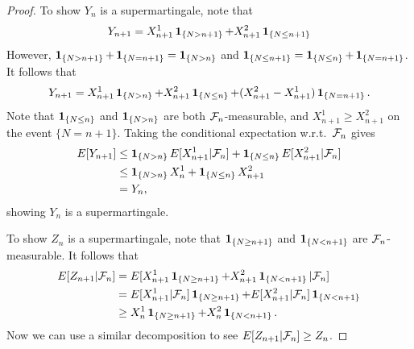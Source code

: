 \documentclass[a4paper]{article}
\begin{document}
\begin{proof}
  To show $Y_n$ is a supermartingale, note that
  \[
    Y_{n + 1} = X_{n + 1}^1 \operatorname{\mathbf{1}}_{\{N > n + 1\}} + X_{n + 1}^2 \operatorname{\mathbf{1}}_{\{N \leq n + 1\}}
  \]
  However, $\operatorname{\mathbf{1}}_{\{N > n + 1\}} + \operatorname{\mathbf{1}}_{\{N = n + 1\}} = \operatorname{\mathbf{1}}_{\{N > n\}}$
  and $\operatorname{\mathbf{1}}_{\{N \leq n + 1\}} = \operatorname{\mathbf{1}}_{\{N \leq n\}} + \operatorname{\mathbf{1}}_{\{N = n + 1\}}$.
  It follows that
  \[
    Y_{n + 1} = X_{n + 1}^1 \operatorname{\mathbf{1}}_{\{N > n\}}
    + X_{n + 1}^2 \operatorname{\mathbf{1}}_{\{N \leq n\}}
    + (X_{n+1}^2 - X_{n+1}^1) \operatorname{\mathbf{1}}_{\{N = n + 1\}}.
  \]
  Note that $\operatorname{\mathbf{1}}_{\{N \leq n\}}$ and
  $\operatorname{\mathbf{1}}_{\{N > n\}}$ are both $\mathcal{F}_n$-measurable, and
  $X_{n+1}^1 \geq X_{n+1}^2$ on the event $\{N = n + 1\}$.
  Taking the conditional expectation w.r.t.\ $\mathcal{F}_n$ gives
  \begin{align*}
    E[Y_{n + 1}]
     & \leq \operatorname{\mathbf{1}}_{\{N > n\}} E[X_{n+1}^1 | \mathcal{F}_n]
    + \operatorname{\mathbf{1}}_{\{N \leq n\}} E[X_{n+1}^2 | \mathcal{F}_n]                   \\
     & \leq \operatorname{\mathbf{1}}_{\{N > n\}} X_n^1 + \operatorname{\mathbf{1}}_{\{N \leq n\}} X_{n+1}^2 \\
     & = Y_n,
  \end{align*}
  showing $Y_n$ is a supermartingale.

  To show $Z_n$ is a supermartingale, note that $\operatorname{\mathbf{1}}_{\{N \geq n + 1\}}$
  and $\operatorname{\mathbf{1}}_{\{N < n + 1\}}$ are $\mathcal{F}_n$-measurable. It follows that
  \begin{align*}
    E[Z_{n + 1} | \mathcal{F}_n]
     & = E[X_{n + 1}^1 \operatorname{\mathbf{1}}_{\{N \geq n + 1\}} + X_{n + 1}^2 \operatorname{\mathbf{1}}_{\{N < n + 1\}} | \mathcal{F}_n]               \\
     & = E[X_{n + 1}^1 | \mathcal{F}_n] \operatorname{\mathbf{1}}_{\{N \geq n + 1\}} + E[X_{n + 1}^2  | \mathcal{F}_n] \operatorname{\mathbf{1}}_{\{N < n + 1\}} \\
     & \geq X_n^1 \operatorname{\mathbf{1}}_{\{N \geq n + 1\}} + X_n^2 \operatorname{\mathbf{1}}_{\{N < n + 1\}}.
  \end{align*}
  Now we can use a similar decomposition to see
  $E[Z_{n + 1} | \mathcal{F}_n] \geq Z_n$.

\end{proof}
\end{document}
